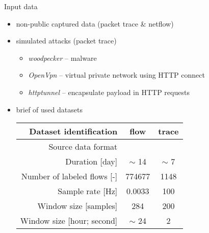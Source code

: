 \documentclass{beamer}
\begin{document}
\begin{frame}{Input data}
 \begin{itemize}
 	\item<1-> non-public captured data (packet trace \& netflow)
	\item<2-> simulated attacks (packet trace)
	\begin{itemize}
		\item<3-> \emph{woodpecker} -- malware
		\item<4-> \emph{OpenVpn} -- virtual private network using HTTP connect
		\item<5-> \emph{httptunnel} -- encapsulate payload in HTTP requests
	\end{itemize}
	\item<6-> brief of used datasets 
 {\small
\begin{table}[h]
    \begin{center}
        \begin{tabular}{r|cc}
        	\textbf{Dataset identification} & \textbf{flow}	&  \textbf{trace} \\ \hline
        	{Source data format} & \code{NetFlow}	&  \code{PCAP} \\ 
        	Duration [day] &  $\sim$  14 &  $\sim$  7 \\
        	Number of labeled flows [-] & 774677 & 1148\\
        	Sample rate [Hz] & 0.0033 & 100  \\
        	Window size [samples] & 284 & 200  \\ %
        	Window size  [hour; second] & $\sim$ 24 & 2  \\
        \end{tabular}
    \end{center}
    \label{tbl:datasets}
\end{table}
}
\end{itemize}
\end{frame}
\end{document}
